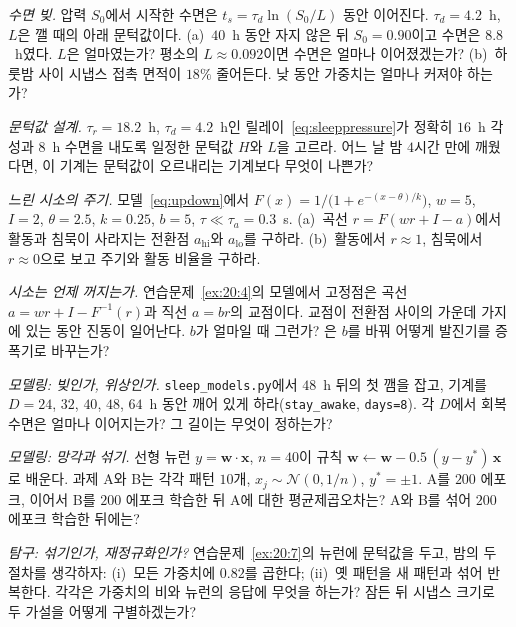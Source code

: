 \begin{exercise}[\lvlA]
\label{ex:20:2}
\emph{수면 빚.} 압력 $S_0$에서 시작한 수면은 $t_s=\tau_d\ln(S_0/L)$ 동안 이어진다. $\tau_d=4.2$~h, $L$은 깰 때의 아래 문턱값이다. (a)~$40$~h 동안 자지 않은 뒤 $S_0=0.90$이고 수면은 $8.8$~h였다. $L$은 얼마였는가? 평소의 $L\approx0.092$이면 수면은 얼마나 이어졌겠는가? (b)~하룻밤 사이 시냅스 접촉 면적이 $18\%$ 줄어든다. 낮 동안 가중치는 얼마나 커져야 하는가?
\end{exercise}

\begin{exercise}[\lvlB]
\label{ex:20:3}
\emph{문턱값 설계.} $\tau_r=18.2$~h, $\tau_d=4.2$~h인 릴레이~\eqref{eq:sleeppressure}가 정확히 $16$~h 각성과 $8$~h 수면을 내도록 일정한 문턱값 $H$와 $L$을 고르라. 어느 날 밤 $4$시간 만에 깨웠다면, 이 기계는 문턱값이 오르내리는 기계보다 무엇이 나쁜가?
\end{exercise}

\begin{exercise}[\lvlB]
\label{ex:20:4}
\emph{느린 시소의 주기.} 모델~\eqref{eq:updown}에서 $F(x)=1/\bigl(1+e^{-(x-\theta)/k}\bigr)$, $w=5$, $I=2$, $\theta=2.5$, $k=0.25$, $b=5$, $\tau\ll\tau_a=0.3$~s. (a)~곡선 $r=F(wr+I-a)$에서 활동과 침묵이 사라지는 전환점 $a_{\text{hi}}$와 $a_{\text{lo}}$를 구하라. (b)~활동에서 $r\approx1$, 침묵에서 $r\approx0$으로 보고 주기와 활동 비율을 구하라.
\end{exercise}

\begin{exercise}[\lvlB]
\label{ex:20:5}
\emph{시소는 언제 꺼지는가.} 연습문제~\ref{ex:20:4}의 모델에서 고정점은 곡선 $a=wr+I-F^{-1}(r)$과 직선 $a=br$의 교점이다. 교점이 전환점 사이의 가운데 가지에 있는 동안 진동이 일어난다. $b$가 얼마일 때 그런가? 은 $b$를 바꿔 어떻게 발진기를 증폭기로 바꾸는가?
\end{exercise}

\begin{exercise}[\lvlB]
\label{ex:20:6}
\emph{모델링: 빚인가, 위상인가.} \texttt{sleep\_models.py}에서 $48$~h 뒤의 첫 깸을 잡고, 기계를 $D=24$, $32$, $40$, $48$, $64$~h 동안 깨어 있게 하라(\texttt{stay\_awake}, \texttt{days=8}). 각 $D$에서 회복 수면은 얼마나 이어지는가? 그 길이는 무엇이 정하는가?
\end{exercise}

\begin{exercise}[\lvlB]
\label{ex:20:7}
\emph{모델링: 망각과 섞기.} 선형 뉴런 $y=\mathbf w\cdot\mathbf x$, $n=40$이 규칙 $\mathbf w\leftarrow\mathbf w-0.5\,(y-y^*)\,\mathbf x$로 배운다. 과제 A와 B는 각각 패턴 $10$개, $x_j\sim\mathcal N(0,1/n)$, $y^*=\pm1$. A를 $200$ 에포크, 이어서 B를 $200$ 에포크 학습한 뒤 A에 대한 평균제곱오차는? A와 B를 섞어 $200$ 에포크 학습한 뒤에는?
\end{exercise}

\begin{exercise}[\lvlC]
\label{ex:20:8}
\emph{탐구: 섞기인가, 재정규화인가?} 연습문제~\ref{ex:20:7}의 뉴런에 문턱값을 두고, 밤의 두 절차를 생각하자: (i)~모든 가중치에 $0.82$를 곱한다; (ii)~옛 패턴을 새 패턴과 섞어 반복한다. 각각은 가중치의 비와 뉴런의 응답에 무엇을 하는가? 잠든 뒤 시냅스 크기로 두 가설을 어떻게 구별하겠는가?
\end{exercise}

